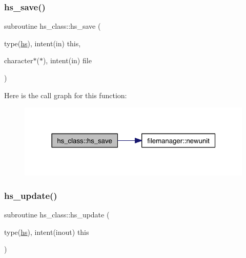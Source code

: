 \subsubsection{\texorpdfstring{hs\+\_\+save()}{hs\_save()}}
{\footnotesize\ttfamily subroutine hs\+\_\+class\+::hs\+\_\+save (\begin{DoxyParamCaption}\item[{type(\hyperlink{strucths__class_1_1hs}{hs}), intent(in)}]{this,  }\item[{character$\ast$($\ast$), intent(in)}]{file }\end{DoxyParamCaption})\hspace{0.3cm}{\ttfamily [private]}}

Here is the call graph for this function\+:\nopagebreak
\begin{figure}[H]
\begin{center}
\leavevmode
\includegraphics[width=322pt]{namespacehs__class_a3b78604825b27d4d06a70aac14b8c538_cgraph}
\end{center}
\end{figure}
\mbox{\label{namespacehs__class_a8a479624da65dc4f4a5cae9826487bec}} 
\subsubsection{\texorpdfstring{hs\+\_\+update()}{hs\_update()}}
{\footnotesize\ttfamily subroutine hs\+\_\+class\+::hs\+\_\+update (\begin{DoxyParamCaption}\item[{type(\hyperlink{strucths__class_1_1hs}{hs}), intent(inout)}]{this }\end{DoxyParamCaption})\hspace{0.3cm}{\ttfamily [private]}}

